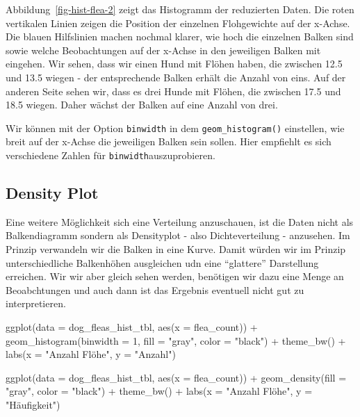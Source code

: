 \documentclass[
  letterpaper,
  DIV=11,
  oneside]{scrreport}
\newenvironment{Shaded}{\begin{snugshade}}{\end{snugshade}}
\newcommand{\AttributeTok}[1]{\textcolor[rgb]{0.40,0.45,0.13}{#1}}
\newcommand{\DecValTok}[1]{\textcolor[rgb]{0.68,0.00,0.00}{#1}}
\newcommand{\FunctionTok}[1]{\textcolor[rgb]{0.28,0.35,0.67}{#1}}
\newcommand{\NormalTok}[1]{\textcolor[rgb]{0.00,0.23,0.31}{#1}}
\newcommand{\SpecialCharTok}[1]{\textcolor[rgb]{0.37,0.37,0.37}{#1}}
\newcommand{\StringTok}[1]{\textcolor[rgb]{0.13,0.47,0.30}{#1}}
\begin{document}
Abbildung~\ref{fig-hist-flea-2} zeigt das Histogramm der reduzierten
Daten. Die roten vertikalen Linien zeigen die Position der einzelnen
Flohgewichte auf der x-Achse. Die blauen Hilfslinien machen nochmal
klarer, wie hoch die einzelnen Balken sind sowie welche Beobachtungen
auf der x-Achse in den jeweiligen Balken mit eingehen. Wir sehen, dass
wir einen Hund mit Flöhen haben, die zwischen 12.5 und 13.5 wiegen - der
entsprechende Balken erhält die Anzahl von eins. Auf der anderen Seite
sehen wir, dass es drei Hunde mit Flöhen, die zwischen 17.5 und 18.5
wiegen. Daher wächst der Balken auf eine Anzahl von drei.

Wir können mit der Option \texttt{binwidth} in dem
\texttt{geom\_histogram()} einstellen, wie breit auf der x-Achse die
jeweiligen Balken sein sollen. Hier empfiehlt es sich verschiedene
Zahlen für \texttt{binwidth}auszuprobieren.

\hypertarget{density-plot}{%
\subsection{Density Plot}\label{density-plot}}

Eine weitere Möglichkeit sich eine Verteilung anzuschauen, ist die Daten
nicht als Balkendiagramm sondern als Densityplot - also Dichteverteilung
- anzusehen. Im Prinzip verwandeln wir die Balken in eine Kurve. Damit
würden wir im Prinzip unterschiedliche Balkenhöhen ausgleichen udn eine
``glattere'' Darstellung erreichen. Wir wir aber gleich sehen werden,
benötigen wir dazu eine Menge an Beoabchtungen und auch dann ist das
Ergebnis eventuell nicht gut zu interpretieren.

\begin{Shaded}
\begin{Highlighting}[]
\FunctionTok{ggplot}\NormalTok{(}\AttributeTok{data =}\NormalTok{ dog\_fleas\_hist\_tbl, }\FunctionTok{aes}\NormalTok{(}\AttributeTok{x =}\NormalTok{ flea\_count)) }\SpecialCharTok{+}
  \FunctionTok{geom\_histogram}\NormalTok{(}\AttributeTok{binwidth =} \DecValTok{1}\NormalTok{, }\AttributeTok{fill =} \StringTok{"gray"}\NormalTok{, }\AttributeTok{color =} \StringTok{"black"}\NormalTok{) }\SpecialCharTok{+}
  \FunctionTok{theme\_bw}\NormalTok{() }\SpecialCharTok{+}
  \FunctionTok{labs}\NormalTok{(}\AttributeTok{x =} \StringTok{"Anzahl Flöhe"}\NormalTok{, }\AttributeTok{y =} \StringTok{"Anzahl"}\NormalTok{)}

\FunctionTok{ggplot}\NormalTok{(}\AttributeTok{data =}\NormalTok{ dog\_fleas\_hist\_tbl, }\FunctionTok{aes}\NormalTok{(}\AttributeTok{x =}\NormalTok{ flea\_count)) }\SpecialCharTok{+}
  \FunctionTok{geom\_density}\NormalTok{(}\AttributeTok{fill =} \StringTok{"gray"}\NormalTok{, }\AttributeTok{color =} \StringTok{"black"}\NormalTok{) }\SpecialCharTok{+}
  \FunctionTok{theme\_bw}\NormalTok{() }\SpecialCharTok{+}
  \FunctionTok{labs}\NormalTok{(}\AttributeTok{x =} \StringTok{"Anzahl Flöhe"}\NormalTok{, }\AttributeTok{y =} \StringTok{"Häufigkeit"}\NormalTok{) }
\end{Highlighting}
\end{Shaded}
\end{document}

